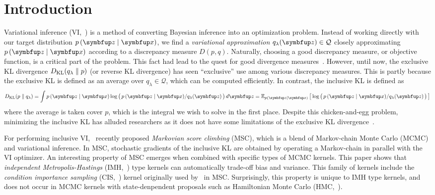 
\section{Introduction}
Variational inference (VI,~\citealt{jordan_introduction_1999, blei_variational_2017}) is a method of converting Bayesian inference into an optimization problem.
Instead of working directly with our target distribution \(p\,(\vz\mid\vx)\), we find a \textit{variational approximation} \(q_{\lambda}(\vz) \in \mathcal{Q}\) closely approximating \(p\,(\vz\mid\vx)\) according to a discrepancy measure \(D(p, q)\).
Naturally, choosing a good discrepancy measure, or objective function, is a critical part of the problem.
This fact had lead to the quest for good divergence measures~\citep{NIPS2016_7750ca35, NIPS2017_35464c84, pmlr-v97-ruiz19a}.
However, until now, the exclusive KL divergence \(D_{\mathrm{KL}}(q_{\lambda}\parallel p)\) (or reverse KL divergence) has seen ``exclusive'' use among various discrepancy measures.
This is partly because the exclusive KL is defined as an average over \(q_{\lambda} \in \mathcal{Q}\), which can be computed efficiently.
In contrast, the inclusive KL is defined as
%
\begin{align}
  \DKL{p}{q_{\lambda}} = \int p\,(\vz\mid\vx) \log\big(\, p\,(\vz\mid\vx)/q_{\lambda}(\vz) \,\big)\,d\vz
  = \Esub{p(\vz\mid\vx)}{\log\big(\, p\,(\vz\mid\vx)/q_{\lambda}(\vz) \,\big) } \label{eq:klpq}
\end{align}
%
where the average is taken cover \(p\), which is the integral we wish to solve in the first place.
Despite this chicken-and-egg problem, minimizing the inclusive KL has alluded researchers as it does not have some limitations of the exclusive KL divergence~\citep{minka2005divergence, mackay_local_2001}.

For performing inclusive VI,~\citet{NEURIPS2020_b2070693, pmlr-v124-ou20a} recently proposed \textit{Markovian score climbing} (MSC), which is a blend of Markov-chain Monte Carlo (MCMC) and variational inference.
In MSC, stochastic gradients of the inclusive KL are obtained by operating a Markov-chain in parallel with the VI optimizer.
An interesting property of MSC emerges when combined with specific types of MCMC kernels.
This paper shows that \textit{independent Metropolis-Hastings} (IMH,~\citealt{robert_monte_2004}) type kernels can automatically trade-off bias and variance.
This family of kernels include the \textit{condition importance sampling} (CIS,~\citealt{NEURIPS2020_b2070693}) kernel originally used by~\citeauthor{NEURIPS2020_b2070693} in MSC.
Surprisingly, this property is unique to IMH type kernels, and does not occur in MCMC kernels with state-denpendent proposals such as Hamiltonian Monte Carlo (HMC,~\citealt{duane_hybrid_1987, neal_mcmc_2011, betancourt_conceptual_2017}).

